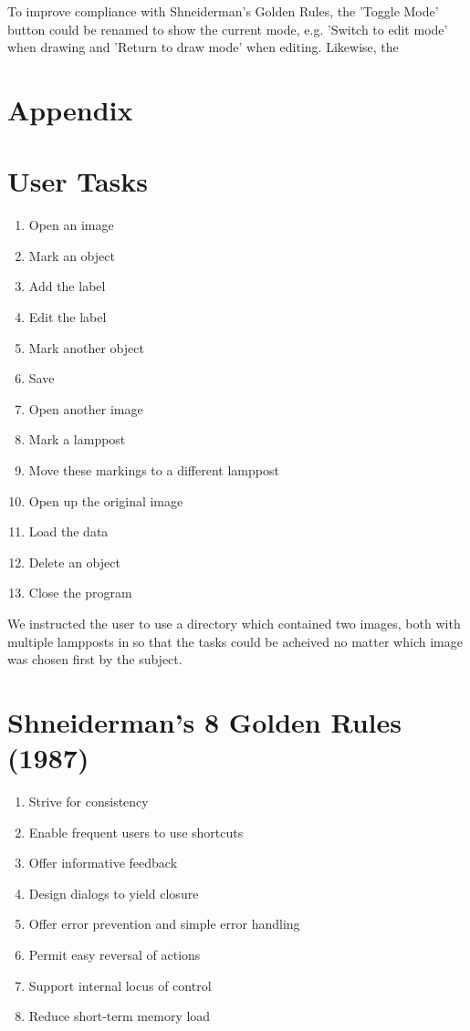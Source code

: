 \documentclass[a4paper,11pt,oneside]{article}
\begin{document}
To improve compliance with Shneiderman's Golden Rules, the 'Toggle Mode' button could be renamed to show the current mode, e.g. 'Switch to edit mode' when drawing and 'Return to draw mode' when editing. Likewise, the 

\newpage
\section{Appendix}
\appendix

\section{User Tasks}
\label{sec:tasks}

\begin{enumerate}
\item Open an image
\item Mark an object
\item Add the label
\item Edit the label
\item Mark another object
\item Save
\item Open another image
\item Mark a lamppost
\item Move these markings to a different lamppost
\item Open up the original image
\item Load the data
\item Delete an object
\item Close the program
\end{enumerate}

We instructed the user to use a directory which contained two images, both with multiple lampposts in so that the tasks could be acheived no matter which image was chosen first by the subject.

\section{Shneiderman’s 8 Golden Rules (1987)}
\label{sec:s_rules}
\begin{enumerate}
\item Strive for consistency
\item Enable frequent users to use shortcuts
\item Offer informative feedback
\item Design dialogs to yield closure
\item Offer error prevention and simple error handling
\item Permit easy reversal of actions
\item Support internal locus of control
\item Reduce short-term memory load 
\end{enumerate}
\end{document}
